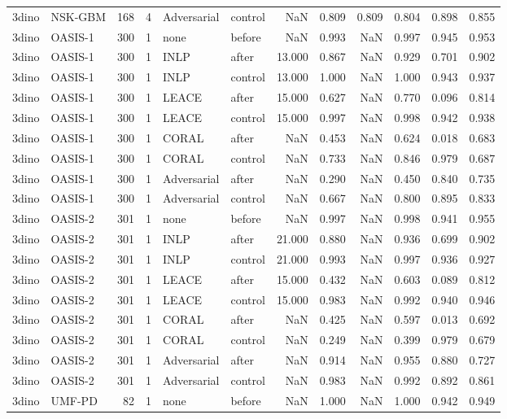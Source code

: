 \begin{tabular}{llrrllrrrrrr}
3dino & NSK-GBM & 168 & 4 & Adversarial & control & NaN & 0.809 & 0.809 & 0.804 & 0.898 & 0.855 \\
3dino & OASIS-1 & 300 & 1 & none & before & NaN & 0.993 & NaN & 0.997 & 0.945 & 0.953 \\
3dino & OASIS-1 & 300 & 1 & INLP & after & 13.000 & 0.867 & NaN & 0.929 & 0.701 & 0.902 \\
3dino & OASIS-1 & 300 & 1 & INLP & control & 13.000 & 1.000 & NaN & 1.000 & 0.943 & 0.937 \\
3dino & OASIS-1 & 300 & 1 & LEACE & after & 15.000 & 0.627 & NaN & 0.770 & 0.096 & 0.814 \\
3dino & OASIS-1 & 300 & 1 & LEACE & control & 15.000 & 0.997 & NaN & 0.998 & 0.942 & 0.938 \\
3dino & OASIS-1 & 300 & 1 & CORAL & after & NaN & 0.453 & NaN & 0.624 & 0.018 & 0.683 \\
3dino & OASIS-1 & 300 & 1 & CORAL & control & NaN & 0.733 & NaN & 0.846 & 0.979 & 0.687 \\
3dino & OASIS-1 & 300 & 1 & Adversarial & after & NaN & 0.290 & NaN & 0.450 & 0.840 & 0.735 \\
3dino & OASIS-1 & 300 & 1 & Adversarial & control & NaN & 0.667 & NaN & 0.800 & 0.895 & 0.833 \\
3dino & OASIS-2 & 301 & 1 & none & before & NaN & 0.997 & NaN & 0.998 & 0.941 & 0.955 \\
3dino & OASIS-2 & 301 & 1 & INLP & after & 21.000 & 0.880 & NaN & 0.936 & 0.699 & 0.902 \\
3dino & OASIS-2 & 301 & 1 & INLP & control & 21.000 & 0.993 & NaN & 0.997 & 0.936 & 0.927 \\
3dino & OASIS-2 & 301 & 1 & LEACE & after & 15.000 & 0.432 & NaN & 0.603 & 0.089 & 0.812 \\
3dino & OASIS-2 & 301 & 1 & LEACE & control & 15.000 & 0.983 & NaN & 0.992 & 0.940 & 0.946 \\
3dino & OASIS-2 & 301 & 1 & CORAL & after & NaN & 0.425 & NaN & 0.597 & 0.013 & 0.692 \\
3dino & OASIS-2 & 301 & 1 & CORAL & control & NaN & 0.249 & NaN & 0.399 & 0.979 & 0.679 \\
3dino & OASIS-2 & 301 & 1 & Adversarial & after & NaN & 0.914 & NaN & 0.955 & 0.880 & 0.727 \\
3dino & OASIS-2 & 301 & 1 & Adversarial & control & NaN & 0.983 & NaN & 0.992 & 0.892 & 0.861 \\
3dino & UMF-PD & 82 & 1 & none & before & NaN & 1.000 & NaN & 1.000 & 0.942 & 0.949 \\

\end{tabular}
